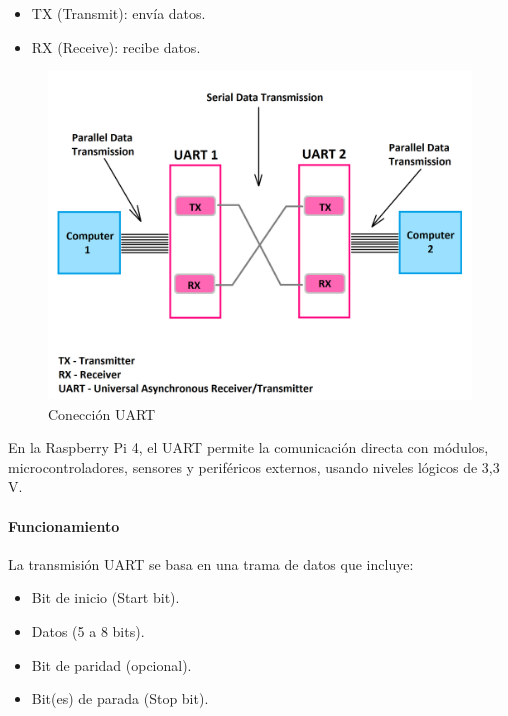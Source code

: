 \documentclass[12pt,a4paper]{article}
\begin{document}
\begin{itemize}
    
\item TX (Transmit): envía datos.

\item RX (Receive): recibe datos.

\end{itemize}

\begin{figure} [H]
\includegraphics[width=0.9\linewidth]{Carpeta tecnica/Conexion UART.png}
\caption{Conección UART}
\end{figure}

En la Raspberry Pi 4, el UART permite la comunicación directa con módulos, microcontroladores, sensores y periféricos externos, usando niveles lógicos de 3,3 V.

\paragraph{Funcionamiento}

La transmisión UART se basa en una trama de datos que incluye:

\begin{itemize}
\item Bit de inicio (Start bit).

\item Datos (5 a 8 bits).

\item Bit de paridad (opcional).

\item Bit(es) de parada (Stop bit).
\end{itemize}
\end{document}
